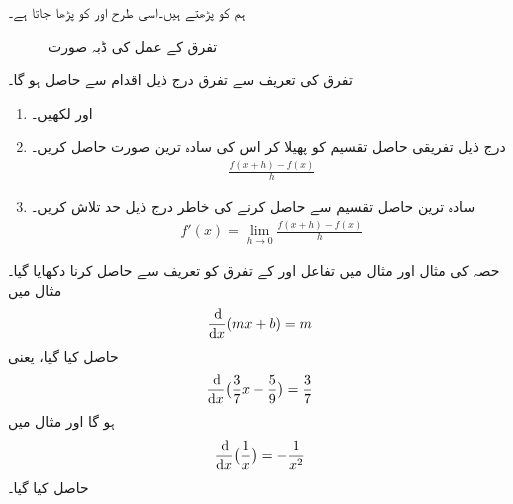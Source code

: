 ہم  کو  پڑھتے ہیں۔اسی طرح  اور  کو  پڑھا جاتا ہے۔
\begin{figure}
\centering
{}
\caption{تفرق کے عمل کی ڈبہ صورت}
\label{شکل_تفرق_ڈبہ_صورت}
\end{figure}

تفرق کی تعریف سے تفرق درج ذیل اقدام سے حاصل ہو گا۔
\begin{enumerate}[1.]

\item
{} اور  لکھیں۔
\item
درج ذیل تفریقی حاصل تقسیم کو پھیلا کر اس کی سادہ ترین صورت حاصل کریں۔
\begin{align*}
\frac{f(x+h)-f(x)}{h}
\end{align*}
\item
سادہ ترین حاصل تقسیم سے  حاصل کرنے کی خاطر درج ذیل حد تلاش کریں۔
\begin{align*}
f'(x)=\lim_{h\to 0}\frac{f(x+h)-f(x)}{h}
\end{align*}
\end{enumerate}

 حصہ   کی مثال  اور مثال  میں تفاعل  اور  کے تفرق کو تعریف سے حاصل کرنا دکھایا گیا۔مثال  میں 
\begin{align*}
\frac{\dif}{\dif x}(mx+b)=m
\end{align*}
حاصل کیا گیا، یعنی 
\begin{align*}
\frac{\dif}{\dif x}\big(\frac{3}{7}x-\frac{5}{9}\big)=\frac{3}{7}
\end{align*}
ہو گا اور    مثال  میں
\begin{align}
\frac{\dif}{\dif x}\big(\frac{1}{x}\big)=-\frac{1}{x^2}
\end{align}
حاصل کیا گیا۔


